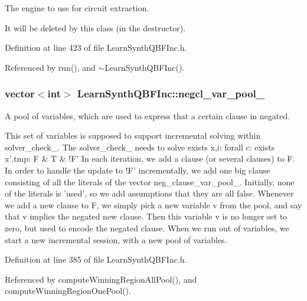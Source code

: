 The engine to use for circuit extraction. 

It will be deleted by this class (in the destructor). 

Definition at line 423 of file Learn\-Synth\-Q\-B\-F\-Inc.\-h.



Referenced by run(), and $\sim$\-Learn\-Synth\-Q\-B\-F\-Inc().

\hypertarget{classLearnSynthQBFInc_a19491f53aaa9f3284ac58beae9136ee8}{
\subsubsection[{negcl\-\_\-var\-\_\-pool\-\_\-}]{\setlength{\rightskip}{0pt plus 5cm}vector$<$int$>$ Learn\-Synth\-Q\-B\-F\-Inc\-::negcl\-\_\-var\-\_\-pool\-\_\-\hspace{0.3cm}{\ttfamily [protected]}}}\label{classLearnSynthQBFInc_a19491f53aaa9f3284ac58beae9136ee8}


A pool of variables, which are used to express that a certain clause in negated. 

This set of variables is supposed to support incremental solving within solver\-\_\-check\-\_\-. The solver\-\_\-check\-\_\- needs to solve exists x,i\-: forall c\-: exists x',tmp\-: F \& T \& !\-F' In each iteration, we add a clause (or several clauses) to F. In order to handle the update to !\-F' incrementally, we add one big clause consisting of all the literals of the vector neg\-\_\-clause\-\_\-var\-\_\-pool\-\_\-. Initially, none of the literals is 'used', so we add assumptions that they are all false. Whenever we add a new clause to F, we simply pick a new variable v from the pool, and say that v implies the negated new clause. Then this variable v is no longer set to zero, but used to encode the negated clause. When we run out of variables, we start a new incremental session, with a new pool of variables. 

Definition at line 385 of file Learn\-Synth\-Q\-B\-F\-Inc.\-h.



Referenced by compute\-Winning\-Region\-All\-Pool(), and compute\-Winning\-Region\-One\-Pool().

